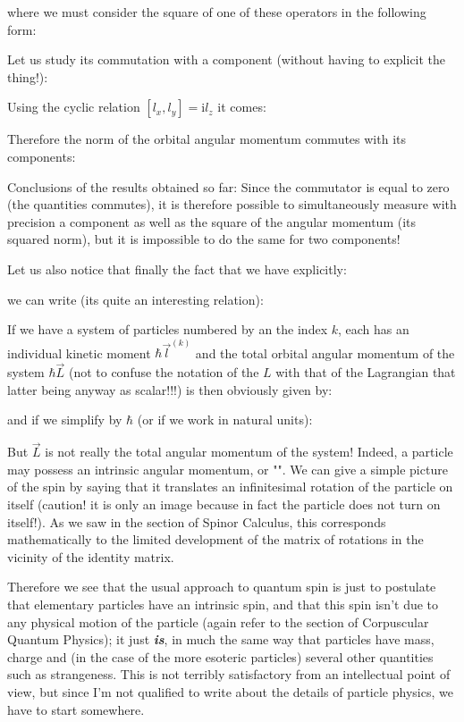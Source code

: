 	where we must consider the square of one of these operators in the following form:
	
	Let us study its commutation with a component (without having to explicit the thing!):
	
	Using the cyclic relation $[l_x,l_y]=\mathrm{i}l_z$ it comes:
	
	Therefore the norm of the orbital angular momentum commutes with its components:
	
	Conclusions of the results obtained so far: Since the commutator is equal to zero (the quantities commutes), it is therefore possible to simultaneously measure with precision a component as well as the square of the angular momentum (its squared norm), but it is impossible to do the same for two components!
	
	Let us also notice that finally the fact that we have explicitly:
	
	we can write (its quite an interesting relation):
	
	If we have a system of particles numbered by an the index $k$, each has an individual kinetic moment $\hbar\vec{l}^{(k)}$ and the total orbital angular momentum of the system $\hbar\vec{L}$ (not to confuse the notation of the $L$ with that of the Lagrangian that latter being anyway as scalar!!!) is then obviously given by:
	
	and if we simplify by $\hbar$ (or if we work in natural units):
	
	But $\vec{L}$ is not really the total angular momentum of the system! Indeed, a particle may possess an intrinsic angular momentum, or "". We can give a simple picture of the spin by saying that it translates an infinitesimal rotation of the particle on itself (caution! it is only an image because in fact the particle does not turn on itself!). As we saw in the section of Spinor Calculus, this corresponds mathematically to the limited development of the matrix of rotations in the vicinity of the identity matrix.
	
	Therefore we see that the usual approach to quantum spin is just to postulate that elementary particles have an intrinsic spin, and that this spin isn't due to any physical motion of the particle (again refer to the section of Corpuscular Quantum Physics); it just \textbf{\textit{is}}, in much the same way that particles have mass, charge and (in the case of the more esoteric particles) several other quantities such as strangeness. This is not terribly satisfactory from an intellectual point of view, but since I'm not qualified to write about the details of particle physics, we have to start somewhere.
	
